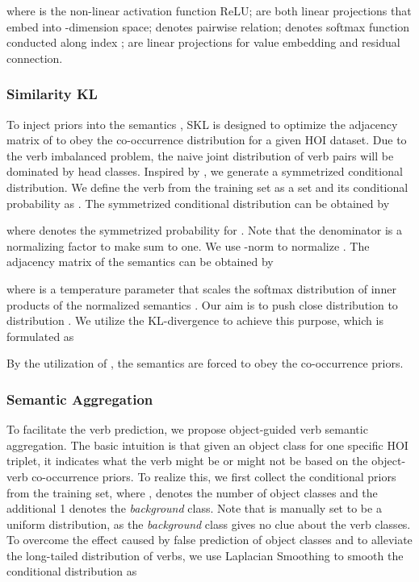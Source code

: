 \documentclass[letterpaper]{article} \usepackage{aaai22}  \usepackage{times}  \usepackage{helvet}  \usepackage{courier}  \usepackage[hyphens]{url}  \usepackage{graphicx} \urlstyle{rm} \def\UrlFont{\rm}  \usepackage{natbib}  \usepackage{caption} \DeclareCaptionStyle{ruled}{labelfont=normalfont,labelsep=colon,strut=off} \frenchspacing  \setlength{\pdfpagewidth}{8.5in}  \setlength{\pdfpageheight}{11in}  \usepackage{algorithm}
\begin{document}
where  is the non-linear activation function ReLU;  are both linear projections that embed  into -dimension space;  denotes pairwise relation;  denotes softmax function conducted along index ;  are linear projections for value embedding and residual connection.


\subsubsection{Similarity KL} To inject priors into the semantics , SKL is designed to optimize the adjacency matrix of  to obey the co-occurrence distribution for a given HOI dataset. Due to the verb imbalanced problem, the naive joint distribution of verb pairs will be dominated by head classes. Inspired by \cite{you2020multilabelMSE}, we generate a symmetrized conditional distribution. We define the verb from the training set as a set  and its conditional probability as . The symmetrized conditional distribution  can be obtained by

where  denotes the symmetrized probability for . Note that the denominator  is a normalizing factor to make  sum to one. We use -norm to normalize . The adjacency matrix  of the semantics  can be obtained by

where  is a temperature parameter that scales the softmax distribution of inner products of the normalized semantics \cite{wu2018nonparametric_instance}. Our aim is to push close distribution  to distribution . We utilize the KL-divergence to achieve this purpose, which is formulated as 

By the utilization of , the semantics are forced to obey the co-occurrence priors.

\subsubsection{Semantic Aggregation} To facilitate the verb prediction, we propose object-guided verb semantic aggregation. The basic intuition is that given an object class for one specific HOI triplet, it indicates what the verb might be or might not be based on the object-verb co-occurrence priors. To realize this, we first collect the conditional priors  from the training set, where ,  denotes the number of object classes and the additional 1 denotes the \textit{background} class. Note that  is manually set to be a uniform distribution, as the \textit{background} class gives no clue about the verb classes. To overcome the effect caused by false prediction of object classes and to alleviate the long-tailed distribution of verbs, we use Laplacian Smoothing \cite{zhai2004smoothingmethods} to smooth the conditional distribution  as 
\end{document}
